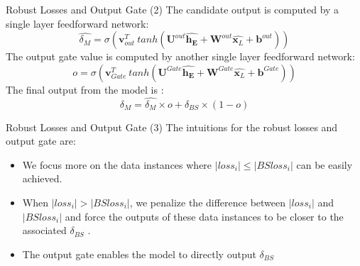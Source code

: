 \documentclass[10pt,table,mathserif]{beamer}
\newcommand{\vx}{\mathbf{x}}
\newcommand{\vv}{\mathbf{v}}
\newcommand{\vW}{\pmb{W}}
\newcommand{\vU}{\pmb{U}}
\newcommand{\vb}{\mathbf{b}}
\begin{document}
\begin{frame}[fragile]{Robust Losses and Output Gate (2)}
The candidate output is computed by a single layer feedforward network:
\begin{equation}
\widehat{\delta_M}=\sigma (\vv^T_{out} \ tanh( \vU^{out} \mathbf{\widehat{h_E}} + \vW^{out} \hat{\vx_L}+ \vb^{out}))
\end{equation}
The output gate value is computed by another single layer feedforward network:
\[
o=\sigma (\vv^T_{Gate} \ tanh( \vU^{Gate} \mathbf{\widehat{h_E}} + \vW^{Gate} \hat{\vx_L}+ \vb^{Gate}))
\]
The final output from the model is :
\[
\delta_M=\widehat{\delta_M} \times o +\delta_{BS} \times (1-o)
\]
\begin{figure}
\end{figure}
\end{frame}


\begin{frame}[fragile]{Robust Losses and Output Gate (3)}
The intuitions for the robust losses and output gate are:
\begin{itemize}
  \item We focus more on the data instances where $|loss_i| \leq |BSloss_i|$  can be easily achieved.
  \item When $|loss_i| > |BSloss_i|$, we penalize the difference between $|loss_i|$ and
$|BSloss_i|$ and force the outputs of these data instances to be closer
to the associated  $\delta_{BS}$ .
  \item The output gate enables the model to directly output $\delta_{BS}$ 
\end{itemize}
\end{frame}
\end{document}
